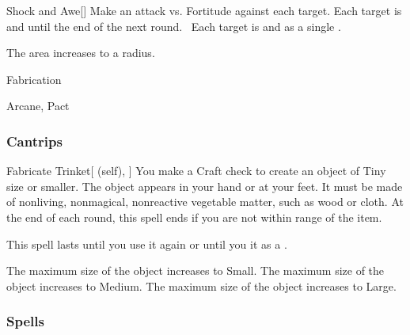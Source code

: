 \lowercase{\hypertarget{spell:Shock and Awe}{}}\label{spell:Shock and Awe}
\begin{freeability}[Rank 5]{\hypertarget{spell:Shock and Awe}{Shock and Awe}}[]
Make an attack vs. Fortitude against each target.
\hit Each target is  and  until the end of the next round.
\ Each target is  and  as a single .

\rankline
{} The area increases to a \arealarge radius.
\end{freeability}
\vspace{0.25em}


\newpage
\begin{spellsection}{Fabrication}

\begin{spellheader}
\end{spellheader}


 Arcane, Pact

\subsubsection{Cantrips}


\begin{attuneability}{Fabricate Trinket}[ (self), ]
You make a Craft check to create an object of Tiny size or smaller.
The object appears in your hand or at your feet.
It must be made of nonliving, nonmagical, nonreactive vegetable matter, such as wood or cloth.
At the end of each round, this spell ends if you are not within \rngmed range of the item.

This spell lasts until you use it again or until you  it as a .

\rankline
{} The maximum size of the object increases to Small.
 The maximum size of the object increases to Medium.
 The maximum size of the object increases to Large.
\end{attuneability}

\end{spellsection}


\subsubsection{Spells}



